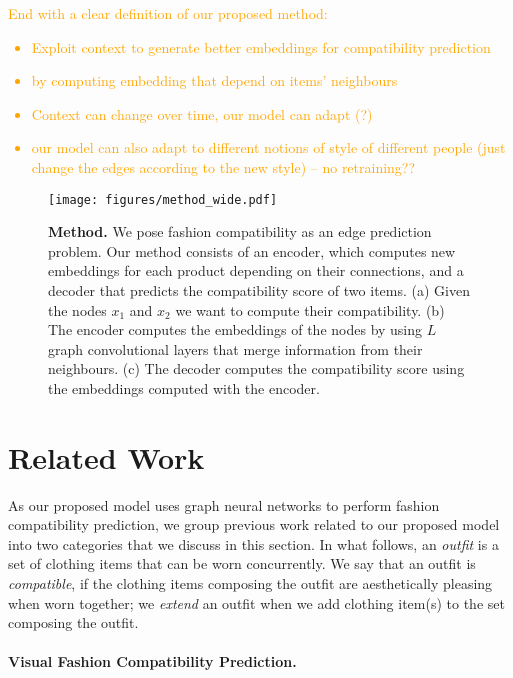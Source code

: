 \documentclass[10pt,twocolumn,letterpaper]{article}
\begin{document}
\textcolor{orange}{End with a clear definition of our proposed method:
\begin{itemize}
    \itemsep0em 
    \item Exploit context to generate better embeddings for compatibility prediction
    \item by computing embedding that depend on items' neighbours
    \item Context can change over time, our model can adapt (?)
    \item our model can also adapt to different notions of style of different people (just change the edges according to the new style) -- no retraining??
\end{itemize}
}
\fi

\begin{figure*}[t]
\begin{center}
\texttt{[image: figures/method\_wide.pdf]}
\end{center}
\caption{\textbf{Method.} We pose fashion compatibility as an edge prediction problem. Our method consists of an encoder, which computes new embeddings for each product depending on their connections, and a decoder that predicts the compatibility score of two items. (a) Given the nodes $x_1$ and $x_2$ we want to compute their compatibility. (b) The encoder computes the embeddings of the nodes by using $L$ graph convolutional layers that merge information from their neighbours. (c) The decoder computes the compatibility score using the embeddings computed with the encoder.}
\label{fig:model}
\end{figure*}



\section{Related Work}
\label{sec:related_work}

As our proposed model uses graph neural networks to perform fashion compatibility prediction,
we group previous work related to our proposed model into two categories that we discuss in this section. 
In what follows, an \emph{outfit} is a set of clothing items that can be worn concurrently.
We say that an outfit is \emph{compatible}, if the clothing items composing the outfit are aesthetically pleasing when worn together;
we \emph{extend} an outfit when we add clothing item(s) to the set composing the outfit. 

\paragraph{Visual Fashion Compatibility Prediction.} 
\end{document}
